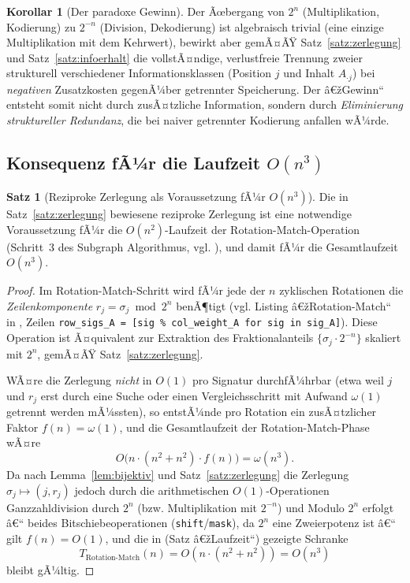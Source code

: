 ﻿\documentclass[a4paper,12pt]{article}
\theoremstyle{definition}
\newtheorem{satz}{Satz}
\newtheorem{korollar}{Korollar}
\begin{document}
\begin{korollar}[Der paradoxe Gewinn]
\label{kor:paradox}
	Der Ãœbergang von $2^n$ (Multiplikation, Kodierung) zu $2^{-n}$
	(Division, Dekodierung) ist algebraisch trivial (eine einzige
	Multiplikation mit dem Kehrwert), bewirkt aber gemÃ¤ÃŸ
	Satz~\ref{satz:zerlegung} und Satz~\ref{satz:infoerhalt} die vollstÃ¤ndige,
	verlustfreie Trennung zweier strukturell verschiedener Informationsklassen
	(Position $j$ und Inhalt $A_{\cdot j}$) bei \emph{negativen} Zusatzkosten
	gegenÃ¼ber getrennter Speicherung. Der â€žGewinn`` entsteht somit nicht durch
	zusÃ¤tzliche Information, sondern durch \emph{Eliminierung struktureller
	Redundanz}, die bei naiver getrennter Kodierung anfallen wÃ¼rde.
\end{korollar}

\subsection{Konsequenz fÃ¼r die Laufzeit $O(n^3)$}

\begin{satz}[Reziproke Zerlegung als Voraussetzung fÃ¼r $O(n^3)$]
\label{satz:laufzeitkonsequenz}
	Die in Satz~\ref{satz:zerlegung} bewiesene reziproke Zerlegung ist eine
	notwendige Voraussetzung fÃ¼r die $O(n^2)$-Laufzeit der
	Rotation-Match-Operation (Schritt~3 des Subgraph Algorithmus, vgl.
	\cite{epp2026subgraph}), und damit fÃ¼r die Gesamtlaufzeit $O(n^3)$.
\end{satz}

\begin{proof}
	Im Rotation-Match-Schritt wird fÃ¼r jede der $n$ zyklischen Rotationen die
	\emph{Zeilenkomponente} $r_j = \sigma_j \bmod 2^n$ benÃ¶tigt (vgl. Listing
	â€žRotation-Match`` in \cite{epp2026subgraph}, Zeilen \texttt{row\_sigs\_A
	= [sig \% col\_weight\_A for sig in sig\_A]}). Diese Operation ist
	Ã¤quivalent zur Extraktion des Fraktionalanteils $\{\sigma_j\cdot2^{-n}\}$
	skaliert mit $2^n$, gemÃ¤ÃŸ Satz~\ref{satz:zerlegung}.

	WÃ¤re die Zerlegung \emph{nicht} in $O(1)$ pro Signatur durchfÃ¼hrbar
	(etwa weil $j$ und $r_j$ erst durch eine Suche oder einen
	Vergleichsschritt mit Aufwand $\omega(1)$ getrennt werden mÃ¼ssten),
	so entstÃ¼nde pro Rotation ein zusÃ¤tzlicher Faktor $f(n) = \omega(1)$,
	und die Gesamtlaufzeit der Rotation-Match-Phase wÃ¤re
	\[
		O\bigl(n \cdot (n^2 + n^2)\cdot f(n)\bigr) = \omega(n^3).
	\]
	Da nach Lemma~\ref{lem:bijektiv} und Satz~\ref{satz:zerlegung} die
	Zerlegung $\sigma_j \mapsto (j, r_j)$ jedoch durch die arithmetischen
	$O(1)$-Operationen Ganzzahldivision durch $2^n$ (bzw. Multiplikation mit
	$2^{-n}$) und Modulo $2^n$ erfolgt â€“ beides Bitschiebeoperationen
	(\texttt{shift}/\texttt{mask}), da $2^n$ eine Zweierpotenz ist â€“ gilt
	$f(n) = O(1)$, und die in \cite{epp2026subgraph} (Satz â€žLaufzeit``)
	gezeigte Schranke
	\[
		T_{\text{Rotation-Match}}(n) = O(n\cdot(n^2+n^2)) = O(n^3)
	\]
	bleibt gÃ¼ltig. \qedhere
\end{proof}
\end{document}
